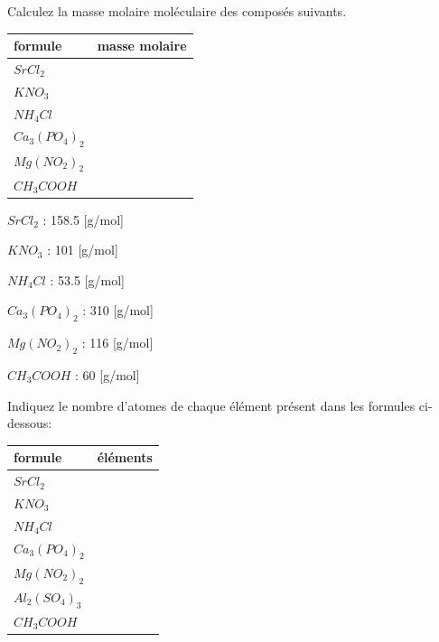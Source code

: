 \documentclass[
  11pt,
  a4paper,
  openany]{book}
\begin{document}
\begin{Exercise}
Calculez la masse molaire moléculaire des composés suivants.

\end{Exercise}

\begin{longtable}[]{@{}lc@{}}
\toprule\noalign{}
formule & masse molaire \\
\midrule\noalign{}
\endhead
\bottomrule\noalign{}
\endlastfoot
\(SrCl_2\) & \\
\(KNO_3\) & \\
\(NH_4Cl\) & \\
\(Ca_3(PO_4)_2\) & \\
\(Mg(NO_2)_2\) & \\
\(CH_3COOH\) & \\
\end{longtable}

\begin{Answer}

\begin{multicols}{2}
\(SrCl_2\) : 158.5 {[}g/mol{]}

\(KNO_3\) : 101 {[}g/mol{]}

\(NH_4Cl\) : 53.5 {[}g/mol{]}

\(Ca_3(PO_4)_2\) : 310 {[}g/mol{]}

\(Mg(NO_2)_2\) : 116 {[}g/mol{]}

\(CH_3COOH\) : 60 {[}g/mol{]}

\end{multicols}

\end{Answer}

\begin{Exercise}
Indiquez le nombre d'atomes de chaque élément présent dans les formules ci-dessous:

\end{Exercise}

\begin{longtable}[]{@{}lc@{}}
\toprule\noalign{}
formule & éléments \\
\midrule\noalign{}
\endhead
\bottomrule\noalign{}
\endlastfoot
\(SrCl_2\) & \includegraphics{images/1px.png} \\
\(KNO_3\) & \\
\(NH_4Cl\) & \\
\(Ca_3(PO_4)_2\) & \\
\(Mg(NO_2)_2\) & \\
\(Al_2(SO_4)_3\) & \\
\(CH_3COOH\) & \\
\end{longtable}
\end{document}
